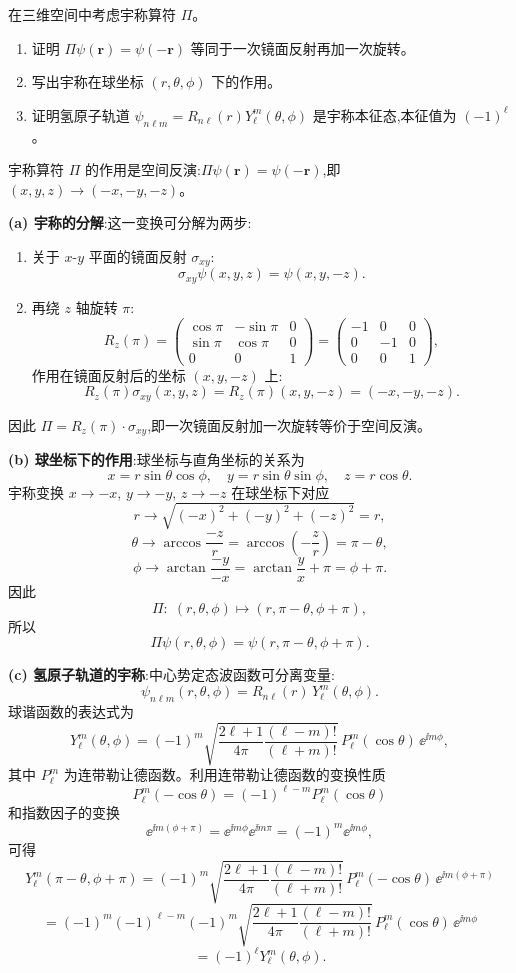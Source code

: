 \begin{question}
在三维空间中考虑宇称算符 $\Pi$。
\begin{enumerate}
\item 证明 $\Pi\psi(\mathbf r)=\psi(-\mathbf r)$ 等同于一次镜面反射再加一次旋转。
\item 写出宇称在球坐标 $(r,\theta,\phi)$ 下的作用。
\item 证明氢原子轨道 $\psi_{n\ell m}=R_{n\ell}(r)Y_\ell^m(\theta,\phi)$ 是宇称本征态,本征值为 $(-1)^\ell$。
\end{enumerate}
\end{question}
\begin{solution}
	宇称算符 $\Pi$ 的作用是空间反演:$\Pi\psi(\mathbf r)=\psi(-\mathbf r)$,即 $(x,y,z)\to(-x,-y,-z)$。

	\textbf{(a) 宇称的分解}:这一变换可分解为两步:
	\begin{enumerate}
	\item 关于 $x$-$y$ 平面的镜面反射 $\sigma_{xy}$:
	\[
	\sigma_{xy}\psi(x,y,z)=\psi(x,y,-z).
	\]
	\item 再绕 $z$ 轴旋转 $\pi$:
	\[
	R_z(\pi)=\begin{pmatrix}\cos\pi&-\sin\pi&0\\\sin\pi&\cos\pi&0\\0&0&1\end{pmatrix}
	=\begin{pmatrix}-1&0&0\\0&-1&0\\0&0&1\end{pmatrix},
	\]
	作用在镜面反射后的坐标 $(x,y,-z)$ 上:
	\[
	R_z(\pi)\sigma_{xy}(x,y,z)=R_z(\pi)(x,y,-z)=(-x,-y,-z).
	\]
	\end{enumerate}
	因此 $\Pi = R_z(\pi) \cdot \sigma_{xy}$,即一次镜面反射加一次旋转等价于空间反演。

	\textbf{(b) 球坐标下的作用}:球坐标与直角坐标的关系为
	\[
	x = r\sin\theta\cos\phi,\quad y = r\sin\theta\sin\phi,\quad z = r\cos\theta.
	\]
	宇称变换 $x\to -x,\,y\to -y,\,z\to -z$ 在球坐标下对应
	\[
	r\to\sqrt{(-x)^2+(-y)^2+(-z)^2}=r,
	\]
	\[
	\theta\to\arccos\frac{-z}{r}=\arccos\!\left(-\frac{z}{r}\right)=\pi-\theta,
	\]
	\[
	\phi\to\arctan\frac{-y}{-x}=\arctan\frac{y}{x}+\pi=\phi+\pi.
	\]
	因此
	\[
	\Pi:\;(r,\theta,\phi)\longmapsto (r,\pi-\theta,\phi+\pi),
	\]
	所以
	\[
	\Pi\psi(r,\theta,\phi)=\psi(r,\pi-\theta,\phi+\pi).
	\]

	\textbf{(c) 氢原子轨道的宇称}:中心势定态波函数可分离变量:
	\[
	\psi_{n\ell m}(r,\theta,\phi)=R_{n\ell}(r)\,Y_\ell^m(\theta,\phi).
	\]
	球谐函数的表达式为
	\[
	Y_\ell^m(\theta,\phi)=(-1)^m\sqrt{\frac{2\ell+1}{4\pi}\frac{(\ell-m)!}{(\ell+m)!}}\,P_\ell^m(\cos\theta)\,\ee^{\ii m\phi},
	\]
	其中 $P_\ell^m$ 为连带勒让德函数。利用连带勒让德函数的变换性质
	\[
	P_\ell^m(-\cos\theta)=(-1)^{\ell-m}P_\ell^m(\cos\theta)
	\]
	和指数因子的变换
	\[
	\ee^{\ii m(\phi+\pi)}=\ee^{\ii m\phi}\ee^{\ii m\pi}=(-1)^m \ee^{\ii m\phi},
	\]
	可得
	\[
	Y_\ell^m(\pi-\theta,\phi+\pi)=(-1)^m\sqrt{\frac{2\ell+1}{4\pi}\frac{(\ell-m)!}{(\ell+m)!}}\,P_\ell^m(-\cos\theta)\,\ee^{\ii m(\phi+\pi)}
	\]
	\[
	=(-1)^m(-1)^{\ell-m}(-1)^m\sqrt{\frac{2\ell+1}{4\pi}\frac{(\ell-m)!}{(\ell+m)!}}\,P_\ell^m(\cos\theta)\,\ee^{\ii m\phi}
	\]
	\[
	=(-1)^\ell Y_\ell^m(\theta,\phi).
	\]


\end{solution}

